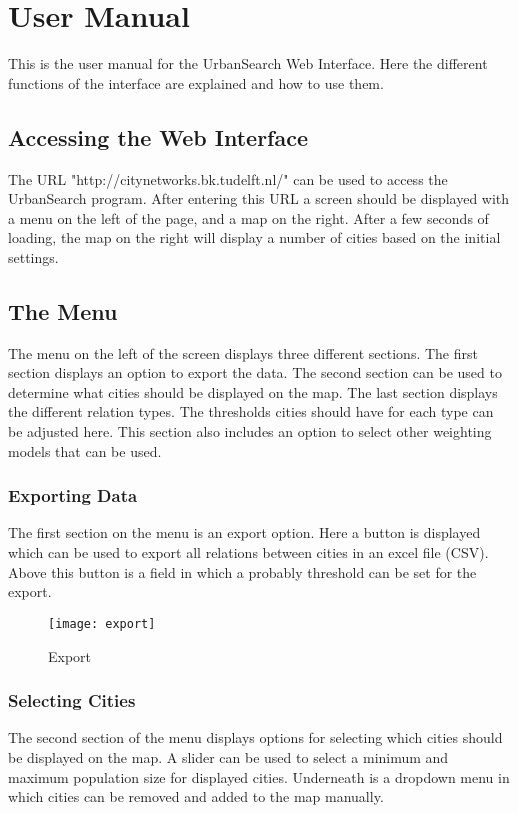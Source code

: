\chapter{User Manual}
This is the user manual for the UrbanSearch Web Interface. Here the different functions of the interface are explained and how to use them. 

\section{Accessing the Web Interface}
The URL "http://citynetworks.bk.tudelft.nl/" can be used to access the UrbanSearch program. After entering this URL a screen should be displayed with a menu on the left of the page, and a map on the right. After a few seconds of loading, the map on the right will display a number of cities based on the initial settings. 


\section{The Menu}
The menu on the left of the screen displays three different sections. The first section displays an option to export the data. The second section can be used to determine what cities should be displayed on the map. The last section displays the different relation types. The thresholds cities should have for each type can be adjusted here. This section also includes an option to select other weighting models that can be used.


\subsection{Exporting Data}
The first section on the menu is an export option. Here a button is displayed which can be used to export all relations between cities in an excel file (CSV). Above this button is a field in which a probably threshold can be set for the export. 

\begin{figure}[H]
    \centering
    \texttt{[image: export]}
    \caption{Export}
    \label{fig:infoflow}
\end{figure}



\subsection{Selecting Cities}
The second section of the menu displays options for selecting which cities should be displayed on the map. A slider can be used to select a minimum and maximum population size for displayed cities. Underneath is a dropdown menu in which cities can be removed and added to the map manually. 

